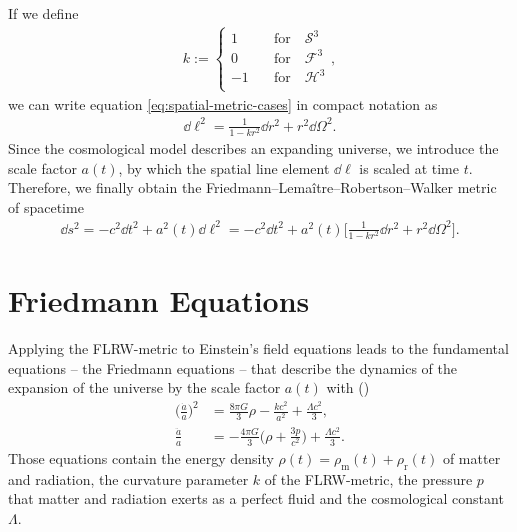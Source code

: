 If we define 
\begin{align}
    k := \begin{cases}
            1 \quad &\text{for} \quad \mathcal{S}^{3} \\
            0 \quad &\text{for} \quad \mathcal{F}^{3} \\
            -1 \quad &\text{for} \quad \mathcal{H}^{3} \\
         \end{cases}, 
\end{align}
we can write equation \eqref{eq:spatial-metric-cases} in compact notation as 
\begin{align}
    \dd{\ell}^2 = \frac{1}{1 - k r^2} \dd{r}^2 + r^2 \dd{\Omega}^2. 
\end{align}
Since the cosmological model describes an expanding universe, we introduce the scale factor $a(t)$, by which the spatial line element $\dd{\ell}$ is scaled at time $t$. \\
Therefore, we finally obtain the Friedmann--Lemaître--Robertson--Walker metric of spacetime
\begin{align}
    \dd{s}^2 = - c^2 \dd{t}^2 + a^2(t) \dd{\ell}^2 = - c^2 \dd{t}^2 + a^2(t) \biggl[\frac{1}{1 - k r^2} \dd{r}^2 + r^2 \dd{\Omega}^2 \biggr]. \label{eq:FLRW-metric}
\end{align}



\section{Friedmann Equations}

Applying the FLRW-metric to Einstein's field equations leads to the fundamental equations -- the Friedmann equations -- that describe the dynamics of the expansion of the universe by the scale factor $a(t)$ with (\cite[p. 11]{Bartelmann2019})
\begin{align}
    \biggl(\frac{\dot{a}}{a}\biggr)^2 &= \frac{8\pi G}{3} \rho - \frac{k c^2}{a^2} + \frac{\Lambda c^2}{3} , \label{eq:friedmann1} \\
    \frac{\ddot{a}}{a} &= -\frac{4\pi G}{3}\biggl( \rho + \frac{3p}{c^2}\biggr) + \frac{\Lambda c^2}{3} \label{eq:friedmann2}.
\end{align}
Those equations contain the energy density $\rho(t) = \rho_{\text{m}}(t) + \rho_{\text{r}}(t)$ of matter and radiation, the curvature parameter $k$ of the FLRW-metric, the pressure $p$ that matter and radiation exerts as a perfect fluid and the cosmological constant $\Lambda$. \\

